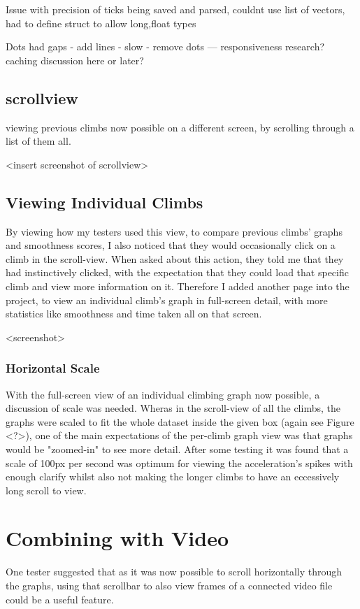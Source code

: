 Issue with precision of ticks being saved and parsed, couldnt use list of vectors, had to define struct to allow long,float types


Dots had gaps - add lines - slow - remove dots ---  responsiveness research?
caching discussion here or later?


\subsection{scrollview}
viewing previous climbs now possible on a different screen, by scrolling through a list of them all.

<insert screenshot of scrollview>

\subsection{Viewing Individual Climbs}
By viewing how my testers used this view, to compare previous climbs' graphs and smoothness scores, I also noticed that they would occasionally click on a climb in the scroll-view.
When asked about this action, they told me that they had instinctively clicked, with the expectation that they could load that specific climb and view more information on it.
Therefore I added another page into the project, to view an individual climb's graph in full-screen detail, with more statistics like smoothness and time taken all on that screen.

<screenshot>



\subsubsection{Horizontal Scale}
With the full-screen view of an individual climbing graph now possible, a discussion of scale was needed. 
Wheras in the scroll-view of all the climbs, the graphs were scaled to fit the whole dataset inside the given box (again see Figure <?>), one of the main expectations of the per-climb graph view was that graphs would be "zoomed-in" to see more detail.
After some testing it was found that a scale of 100px per second was optimum for viewing the acceleration's spikes with enough clarify whilst also not making the longer climbs to have an eccessively long scroll to view. 



\section{Combining with Video}
One tester suggested that as it was now possible to scroll horizontally through the graphs, using that scrollbar to also view frames of a connected video file could be a useful feature.

